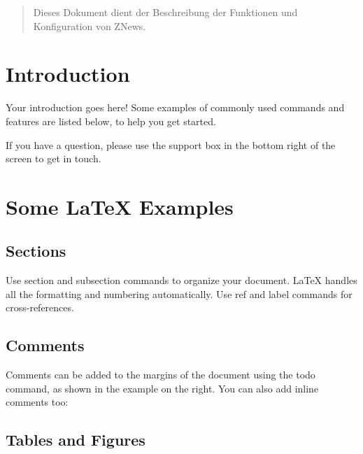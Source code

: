 \begin{titlepage}

        \vfill

    \end{titlepage}


    \begin{abstract}
        Dieses Dokument dient der Beschreibung der Funktionen
        und Konfiguration von ZNews.
    \end{abstract}

    \section{Introduction}

    Your introduction goes here! Some examples of commonly used commands and features are listed below, to help you get started.

    If you have a question, please use the support box in the bottom right of the screen to get in touch.

    \section{Some \LaTeX{} Examples}
    \label{sec:examples}

    \subsection{Sections}

    Use section and subsection commands to organize your document. \LaTeX{} handles all the formatting and numbering automatically. Use ref and label commands for cross-references.

    \subsection{Comments}

    Comments can be added to the margins of the document using the  todo command, as shown in the example on the right. You can also add inline comments too:


    \subsection{Tables and Figures}

